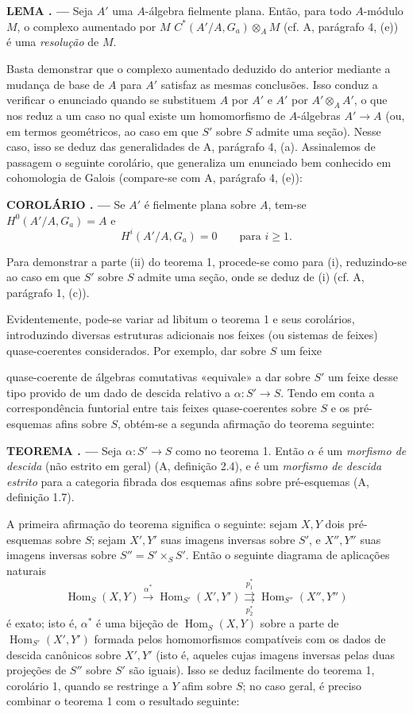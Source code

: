 \documentclass[11pt,twoside,openany]{book}
\numberwithin{equation}{section}
\newcommand{\src}[1]{%
  \phantomsection\hypertarget{src:#1}{}%
  \marginpar{\raggedleft\footnotesize\sffamily #1}%
}
\theoremstyle{plain}
\theoremstyle{definition}
\theoremstyle{remark}
\newcommand{\result}[2]{%
  \par\medskip\noindent\textbf{#1%
  \if\relax\detokenize{#2}\relax\else\space#2\fi. ---}\enspace
}
\newcommand{\FgaUnitKey}{frontmatter}
\renewcommand{\src}[1]{%
  \phantomsection\hypertarget{src:\FgaUnitKey:#1}{}%
  \marginpar{\raggedleft\footnotesize\sffamily #1}%
}
\begin{document}
\result{LEMA}{1.1} Seja $A'$ uma $A$-álgebra fielmente plana. Então, para
todo $A$-módulo $M$, o complexo aumentado por $M$
$C^*(A'/A,G_a)\otimes_A M$ (cf. A, parágrafo 4, (e)) é uma
\emph{resolução} de $M$.

Basta demonstrar que o complexo aumentado deduzido do anterior mediante a
mudança de base de $A$ para $A'$ satisfaz as mesmas conclusões. Isso conduz a
verificar o enunciado quando se substituem $A$ por $A'$ e $A'$ por
$A'\otimes_AA'$, o que nos reduz a um caso no qual existe um
homomorfismo de $A$-álgebras $A'\longrightarrow A$ (ou, em termos
geométricos, ao caso em que $S'$ sobre $S$ admite uma seção). Nesse caso,
isso se deduz das generalidades de A, parágrafo 4, (a). Assinalemos de passagem
o seguinte corolário, que generaliza um enunciado bem conhecido em
cohomologia de Galois (compare-se com A, parágrafo 4, (e)):

\result{COROLÁRIO}{} Se $A'$ é fielmente plana sobre $A$, tem-se
$H^0(A'/A,G_a)=A$ e
\[
  H^i(A'/A,G_a)=0\qquad\text{para $i\geq1$}.
\]

Para demonstrar a parte (ii) do teorema 1, procede-se como para (i),
reduzindo-se ao caso em que $S'$ sobre $S$ admite uma seção, onde se deduz
de (i) (cf. A, parágrafo 1, (c)).

Evidentemente, pode-se variar ad libitum o teorema 1 e seus corolários,
introduzindo diversas estruturas adicionais nos feixes (ou sistemas de
feixes) quase-coerentes considerados. Por exemplo, dar sobre $S$ um feixe
\src{317}
quase-coerente de álgebras comutativas «equivale» a dar sobre $S'$ um feixe desse
tipo provido de um dado de descida relativo a
$\alpha:S'\longrightarrow S$. Tendo em conta a correspondência funtorial
entre tais feixes quase-coerentes sobre $S$ e os pré-esquemas afins sobre
$S$, obtém-se a segunda afirmação do teorema seguinte:

\result{TEOREMA}{2} Seja $\alpha:S'\longrightarrow S$ como no teorema 1.
Então $\alpha$ é um \emph{morfismo de descida} (não estrito em geral)
(A, definição 2.4), e é um \emph{morfismo de descida estrito} para a
categoria fibrada dos esquemas afins sobre pré-esquemas
(A, definição 1.7).

A primeira afirmação do teorema significa o seguinte: sejam $X,Y$ dois
pré-esquemas sobre $S$; sejam $X',Y'$ suas imagens inversas sobre $S'$, e
$X'',Y''$ suas imagens inversas sobre $S''=S'\times_SS'$. Então o seguinte
diagrama de aplicações naturais
\[
  \operatorname{Hom}_S(X,Y)\xrightarrow{\alpha^*}
  \operatorname{Hom}_{S'}(X',Y')
  \underset{p_2^*}{\overset{p_1^*}{\rightrightarrows}}
  \operatorname{Hom}_{S''}(X'',Y'')
\]
é exato; isto é, $\alpha^*$ é uma bijeção de
$\operatorname{Hom}_S(X,Y)$ sobre a parte de
$\operatorname{Hom}_{S'}(X',Y')$ formada pelos homomorfismos compatíveis com
os dados de descida canônicos sobre $X',Y'$ (isto é, aqueles cujas
imagens inversas pelas duas projeções de $S''$ sobre $S'$ são iguais).
Isso se deduz facilmente do teorema 1, corolário 1, quando se restringe
a $Y$ afim sobre $S$; no caso geral, é preciso combinar o teorema 1 com o
resultado seguinte:
\end{document}
